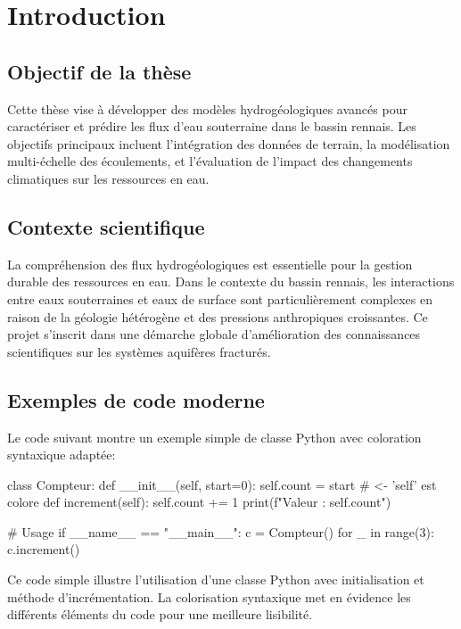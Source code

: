 \chapter{Introduction}

\minitoc

\newpage

\section{Objectif de la thèse}
Cette thèse vise à développer des modèles hydrogéologiques avancés pour caractériser et prédire les flux d'eau souterraine dans le bassin rennais. Les objectifs principaux incluent l'intégration des données de terrain, la modélisation multi-échelle des écoulements, et l'évaluation de l'impact des changements climatiques sur les ressources en eau.

\section{Contexte scientifique}
La compréhension des flux hydrogéologiques est essentielle pour la gestion durable des ressources en eau. Dans le contexte du bassin rennais, les interactions entre eaux souterraines et eaux de surface sont particulièrement complexes en raison de la géologie hétérogène et des pressions anthropiques croissantes. Ce projet s'inscrit dans une démarche globale d'amélioration des connaissances scientifiques sur les systèmes aquifères fracturés.

\section{Exemples de code moderne}

Le code suivant montre un exemple simple de classe Python avec coloration syntaxique adaptée:

\begin{pythoncode}
class Compteur:
    def __init__(self, start=0):
        self.count = start        # <- 'self' est colore
    def increment(self):
        self.count += 1
        print(f"Valeur : {self.count}")

# Usage
if __name__ == "__main__":
    c = Compteur()
    for _ in range(3):
        c.increment()
\end{pythoncode}

Ce code simple illustre l'utilisation d'une classe Python avec initialisation et méthode d'incrémentation. La colorisation syntaxique met en évidence les différents éléments du code pour une meilleure lisibilité.